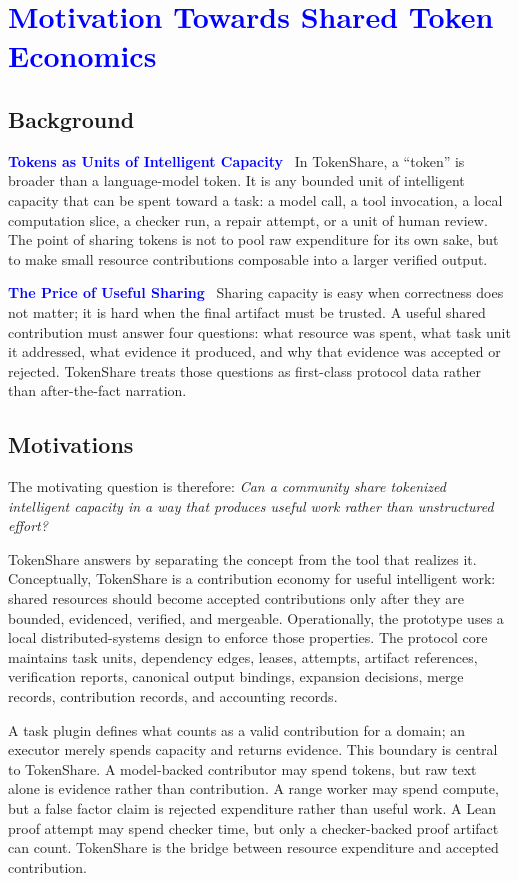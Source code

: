 \documentclass{article}
\theoremstyle{plain}
\begin{document}
\section{\textcolor{blue}{Motivation Towards Shared Token Economics}}


\subsection{Background}

\textbf{\textcolor{blue}{Tokens as Units of Intelligent Capacity}}~
{\color{blue}
In TokenShare, a ``token'' is broader than a language-model token. It is any bounded unit of intelligent capacity that can be spent toward a task: a model call, a tool invocation, a local computation slice, a checker run, a repair attempt, or a unit of human review. The point of sharing tokens is not to pool raw expenditure for its own sake, but to make small resource contributions composable into a larger verified output.
}

\textbf{\textcolor{blue}{The Price of Useful Sharing}}~
{\color{blue}
Sharing capacity is easy when correctness does not matter; it is hard when the final artifact must be trusted. A useful shared contribution must answer four questions: what resource was spent, what task unit it addressed, what evidence it produced, and why that evidence was accepted or rejected. TokenShare treats those questions as first-class protocol data rather than after-the-fact narration.
}


\subsection{Motivations}

{\color{blue}
The motivating question is therefore: \emph{Can a community share tokenized intelligent capacity in a way that produces useful work rather than unstructured effort?}

TokenShare answers by separating the concept from the tool that realizes it. Conceptually, TokenShare is a contribution economy for useful intelligent work: shared resources should become accepted contributions only after they are bounded, evidenced, verified, and mergeable. Operationally, the prototype uses a local distributed-systems design to enforce those properties. The protocol core maintains task units, dependency edges, leases, attempts, artifact references, verification reports, canonical output bindings, expansion decisions, merge records, contribution records, and accounting records.

A task plugin defines what counts as a valid contribution for a domain; an executor merely spends capacity and returns evidence. This boundary is central to TokenShare. A model-backed contributor may spend tokens, but raw text alone is evidence rather than contribution. A range worker may spend compute, but a false factor claim is rejected expenditure rather than useful work. A Lean proof attempt may spend checker time, but only a checker-backed proof artifact can count. TokenShare is the bridge between resource expenditure and accepted contribution.
}
\end{document}
